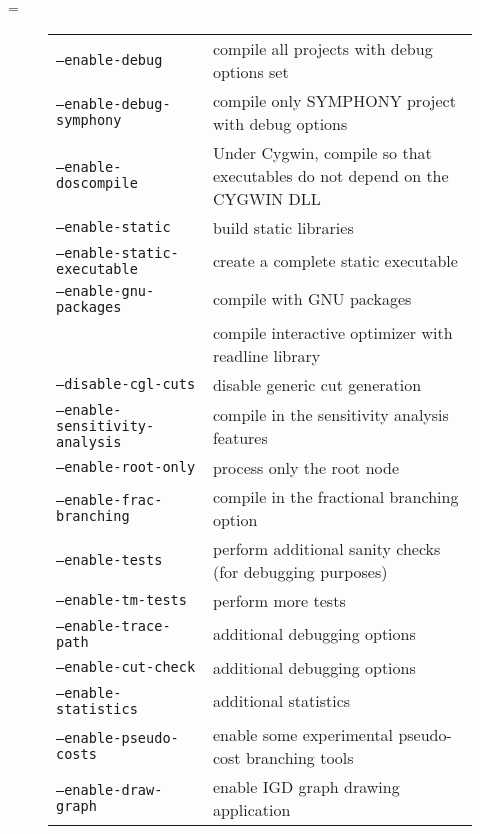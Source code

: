 \documentclass[twoside,11pt]{book}
\makeatletter
\let\realnormalsize=\normalsize
\def\liih@math{\ifmmode$\else\bad@math\fi}
\def\adjustnormalsize{\def\normalsize{\mathsurround=0pt \realnormalsize
 \parindent=0pt\abovedisplayskip=0pt\belowdisplayskip=0pt}%
 \def\phantompar{\csname par\endcsname}\normalsize}%
\newcommand\lthtmlvboxmathA{\adjustnormalsize\setbox\sizebox=\vbox\bgroup %
 \let\ifinner=\iffalse \let\)\liih@math }%
\newcommand\lthtmlmathtype[1]{\gdef\lthtmlmathenv{#1}}%
\newcommand\lthtmlfigureA[1]{\let\@savefreelist\@freelist
       \lthtmlmathtype{#1}\lthtmlvboxmathA}%
\makeatother
\begin{document}
\setcounter{secnumdepth}{3}
{\newpage\clearpage
\lthtmlfigureA{figure615}%
\begin{figure}\begin{tabular}{ll}
\hline
\texttt{--enable-debug} & compile all projects with debug options set \\
\texttt{--enable-debug-symphony} & compile only SYMPHONY project with debug options \\
\texttt{--enable-doscompile} & Under Cygwin, compile so that executables do
not depend on the CYGWIN DLL \\
\texttt{--enable-static} & build static libraries \\
\texttt{--enable-static-executable} &  create a complete static executable \\
\texttt{--enable-gnu-packages} & compile with GNU packages \\
& compile interactive optimizer with readline library \\
\hline
\texttt{--disable-cgl-cuts} & disable generic cut generation \\
\texttt{--enable-sensitivity-analysis} & compile in the sensitivity analysis features \\
\texttt{--enable-root-only} & process only the root node \\
\texttt{--enable-frac-branching} & compile in the fractional branching option \\
\texttt{--enable-tests}&  perform additional sanity checks (for debugging purposes) \\
\texttt{--enable-tm-tests }& perform more tests  \\
\texttt{--enable-trace-path}&  additional debugging options \\
\texttt{--enable-cut-check}& additional debugging options \\
\texttt{--enable-statistics}& additional statistics \\
\texttt{--enable-pseudo-costs}& enable some experimental pseudo-cost branching tools \\
\texttt{--enable-draw-graph} &  enable IGD graph drawing application \\

\end{tabular}
\end{figure}}
\end{document}
